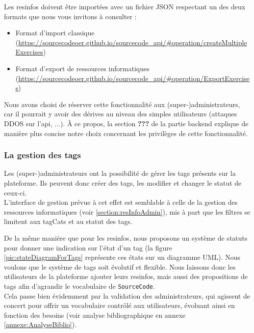 Les \glspl{resinfo} doivent être importées avec un fichier JSON respectant un des deux formats que nous vous invitons à consulter :

\begin{itemize}
    \item Format d'import classique (\url{https://sourcecodeoer.github.io/sourcecode_api/#operation/createMultipleExercises})
    \item Format d'export de ressources informatiques (\url{https://sourcecodeoer.github.io/sourcecode_api/#operation/ExportExercises})
\end{itemize}

Nous avons choisi de réserver cette fonctionnalité aux (super-)administrateurs, car il pourrait y avoir des dérives au niveau des simples utilisateurs (attaques DDOS sur l'\gls{api}, ...). À ce propos, la section \textbf{???} de la partie backend explique de manière plus concise notre choix concernant les privilèges de cette fonctionnalité.

\subsubsection{La gestion des \glspl{tag}}
\label{section:tagAdmin}

Les (super-)administrateurs ont la possibilité de gérer les \glspl{tag} présents sur la plateforme. Ils peuvent donc créer des \glspl{tag}, les modifier et changer le statut de ceux-ci.\\

L'interface de gestion prévue à cet effet est semblable à celle de la gestion des ressources informatiques (voir \ref{section:resInfoAdmin}), mis à part que les filtres se limitent aux \glspl{tagCat} et au statut des \glspl{tag}.


De la même manière que pour les \glspl{resinfo}, nous proposons un système de statuts pour donner une indication sur l'état d'un \gls{tag} (la figure \ref{pic:stateDiagramForTags} représente ces états sur un diagramme UML). Nous voulons que le système de \glspl{tag} soit évolutif et flexible. Nous laissons donc les utilisateurs de la plateforme ajouter leurs \glspl{resinfo}, mais aussi des propositions de \glspl{tag} afin d'agrandir le vocabulaire de \texttt{SourceCode}.\\

Cela passe bien évidemment par la validation des administrateurs, qui agissent de concert pour offrir un vocabulaire contrôlé aux utilisateurs, évoluant ainsi en fonction des besoins (voir analyse bibliographique en annexe \ref{annexe:AnalyseBiblio}).

